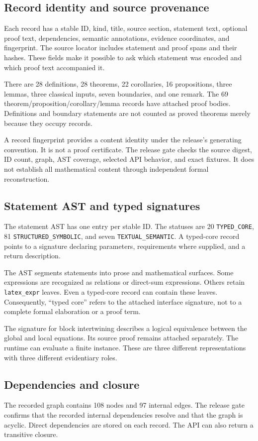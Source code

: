 \documentclass[a4paper,11pt]{article}
\begin{document}
\subsection{Record identity and source provenance}
Each record has a stable ID, kind, title, source section, statement text, optional proof text, dependencies, semantic annotations, evidence coordinates, and fingerprint. The source locator includes statement and proof spans and their hashes. These fields make it possible to ask which statement was encoded and which proof text accompanied it.

There are 28 definitions, 28 theorems, 22 corollaries, 16 propositions, three lemmas, three classical inputs, seven boundaries, and one remark. The 69 theorem/proposition/corollary/lemma records have attached proof bodies. Definitions and boundary statements are not counted as proved theorems merely because they occupy records.

A record fingerprint provides a content identity under the release's generating convention. It is not a proof certificate. The release gate checks the source digest, ID count, graph, AST coverage, selected API behavior, and exact fixtures. It does not establish all mathematical content through independent formal reconstruction.
\subsection{Statement AST and typed signatures}
The statement AST has one entry per stable ID. The statuses are 20 \nolinkurl{TYPED_CORE}, 81 \nolinkurl{STRUCTURED_SYMBOLIC}, and seven \nolinkurl{TEXTUAL_SEMANTIC}. A typed-core record points to a signature declaring parameters, requirements where supplied, and a return description.

The AST segments statements into prose and mathematical surfaces. Some expressions are recognized as relations or direct-sum expressions. Others retain \nolinkurl{latex_expr} leaves. Even a typed-core record can contain these leaves. Consequently, ``typed core'' refers to the attached interface signature, not to a complete formal elaboration or a proof term.

The signature for block intertwining describes a logical equivalence between the global and local equations. Its source proof remains attached separately. The runtime can evaluate a finite instance. These are three different representations with three different evidentiary roles.
\subsection{Dependencies and closure}
The recorded graph contains 108 nodes and 97 internal edges. The release gate confirms that the recorded internal dependencies resolve and that the graph is acyclic. Direct dependencies are stored on each record. The API can also return a transitive closure.
\end{document}
